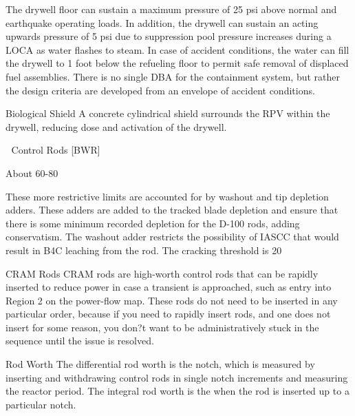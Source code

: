 \documentclass[10pt]{article}
\begin{document}
The drywell floor can sustain a maximum pressure of 25 psi above normal and earthquake operating loads. In addition, the drywell can sustain an acting upwards pressure of 5 psi due to suppression pool pressure increases during a LOCA as water flashes to steam. In case of accident conditions, the water can fill the drywell to 1 foot below the refueling floor to permit safe removal of displaced fuel assemblies. There is no single DBA for the containment system, but rather the design criteria are developed from an envelope of accident conditions. 

Biological Shield
A concrete cylindrical shield surrounds the RPV within the drywell, reducing dose and activation of the drywell. 


Control Rods [BWR]


About 60-80%


These more restrictive limits are accounted for by washout and tip depletion adders. These adders are added to the tracked blade depletion and ensure that there is some minimum recorded depletion for the D-100 rods, adding conservatism. The washout adder restricts the possibility of IASCC that would result in B4C leaching from the rod. The cracking threshold is 20%


CRAM Rods
CRAM rods are high-worth control rods that can be rapidly inserted to reduce power in case a transient is approached, such as entry into Region 2 on the power-flow map. These rods do not need to be inserted in any particular order, because if you need to rapidly insert rods, and one does not insert for some reason, you don?t want to be administratively stuck in the sequence until the issue is resolved. 

Rod Worth
The differential rod worth is the notch, which is measured by inserting and withdrawing control rods in single notch increments and measuring the reactor period. The integral rod worth is the  when the rod is inserted up to a particular notch. 
\end{document}
